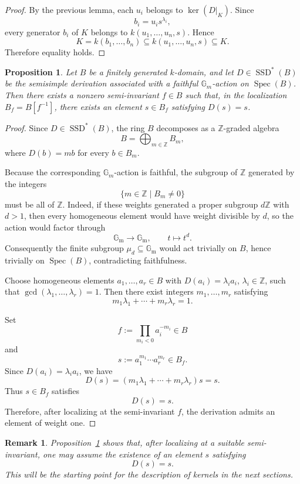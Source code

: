 \documentclass[12pt]{amsart}
\newtheorem{proposition}[theorem]{Proposition}
\newtheorem{remark}[theorem]{Remark}
\newcommand{\GM}{\mathbb{G}_{\mathrm{m}}}
\newcommand{\Z}{\mathbb Z}
\newcommand{\Spec}{\operatorname{Spec}}
\newcommand{\SSD}{\operatorname{SSD}}
\begin{document}
\begin{proof}
By the previous lemma, each $u_i$ belongs to $\ker(D|_K)$. Since
\[
b_i=u_i s^{\lambda_i},
\]
every generator $b_i$ of $K$ belongs to $k(u_1,\dots,u_n,s)$. Hence
\[
K=k(b_1,\dots,b_n)\subseteq k(u_1,\dots,u_n,s)\subseteq K.
\]
Therefore equality holds.
\end{proof}

\begin{proposition}\label{prop:local-slice-faithful}
Let $B$ be a finitely generated $k$-domain, and let $D\in \SSD^{*}(B)$
be the semisimple derivation associated with a faithful $\mathbb G_m$-action on $\Spec(B)$.
Then there exists a nonzero semi-invariant $f\in B$
such that, in the localization
$B_f=B[f^{-1}]$,
there exists an element $s\in B_f$ satisfying $D(s)=s$.
\end{proposition}

\begin{proof}
Since $D\in \SSD^{*}(B)$, the ring $B$ decomposes as a $\mathbb Z$-graded algebra
\[
B=\bigoplus_{m\in \mathbb Z} B_m,
\]
where $D(b)=mb$ for every $b\in B_m$.

Because the corresponding $\mathbb G_m$-action is faithful, the subgroup of $\Z$
generated by the integers
\[
\{m\in \Z \mid B_m\neq 0\}
\]
must be all of $\Z$. Indeed, if these weights generated a proper subgroup $d\Z$ with $d>1$,
then every homogeneous element would have weight divisible by $d$, so the action would factor through
\[
\GM \to \GM,\qquad t\mapsto t^d.
\]
Consequently the finite subgroup $\mu_d\subseteq \GM$ would act trivially on $B$, hence trivially on $\Spec(B)$, contradicting faithfulness.

Choose homogeneous elements $a_1,\dots,a_r\in B$
with $D(a_i)=\lambda_i a_i$,
$\lambda_i\in \Z$,
such that $\gcd(\lambda_1,\dots,\lambda_r)=1$.
Then there exist integers $m_1,\dots,m_r$ satisfying
\[
m_1\lambda_1+\cdots+m_r\lambda_r=1.
\]

Set
\[
f:=\prod_{m_i<0} a_i^{-m_i}\in B
\]
and
\[
s:=a_1^{m_1}\cdots a_r^{m_r}\in B_f.
\]
Since $D(a_i)=\lambda_i a_i$, we have
\[
D(s)=\left(m_1\lambda_1+\cdots+m_r\lambda_r\right)s=s.
\]
Thus $s\in B_f$ satisfies
\[
D(s)=s.
\]
Therefore, after localizing at the semi-invariant $f$, the derivation admits an element of weight one.
\end{proof}

\begin{remark}
Proposition~\ref{prop:local-slice-faithful} shows that, after localizing at a suitable semi-invariant, one may assume the existence of an element $s$ satisfying
\[
D(s)=s.
\]
This will be the starting point for the description of kernels in the next sections.
\end{remark}
\end{document}
